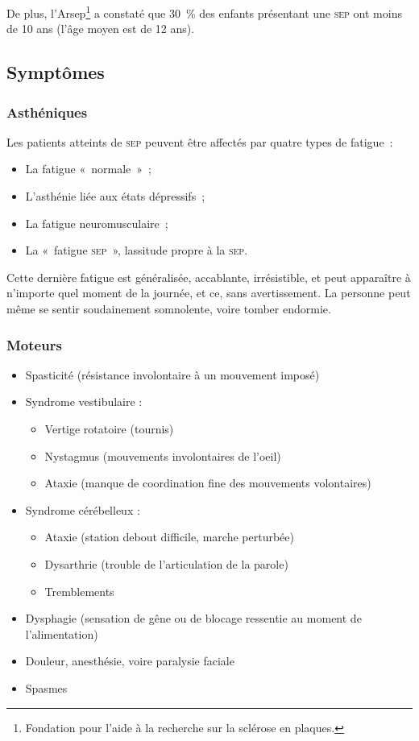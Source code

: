 \documentclass[a4paper,12pt,francais]{article}
\newcommand{\SEP}{\textsc{sep}\xspace}
\begin{document}
De plus, l’Arsep\footnote{Fondation pour l'aide à la recherche sur la sclérose en plaques.} a constaté que 30~\% des enfants présentant une \SEP{} ont moins de 10 ans (l’âge moyen est de 12 ans).

\subsection{Symptômes}

\subsubsection{Asthéniques}
Les patients atteints de \SEP{} peuvent être affectés par quatre types de fatigue~:
\begin{itemize}
    \item La fatigue «~normale~»~;
    \item L’asthénie liée aux états dépressifs~;
    \item La fatigue neuromusculaire~;
    \item La «~fatigue \SEP{}~», lassitude propre à la \SEP{}.
\end{itemize}

Cette dernière fatigue est généralisée, accablante, irrésistible, et peut apparaître à n’importe quel moment de la journée, et ce, sans avertissement. La personne peut même se sentir soudainement somnolente, voire tomber endormie.

\subsubsection{Moteurs}
\begin{itemize}
    \item Spasticité (résistance involontaire à un mouvement imposé)
	\item Syndrome vestibulaire :
			\begin{itemize}
				\item Vertige rotatoire (tournis)
				\item Nystagmus (mouvements involontaires de l'oeil)
				\item Ataxie (manque de coordination fine des mouvements volontaires)
			\end{itemize}
	\item Syndrome cérébelleux :
			\begin{itemize}
				\item Ataxie (station debout difficile, marche perturbée)
				\item Dysarthrie (trouble de l'articulation de la parole)
				\item Tremblements
			\end{itemize}
	\item Dysphagie (sensation de gêne ou de blocage ressentie au moment de l'alimentation)
	\item Douleur, anesthésie, voire paralysie faciale
	\item Spasmes
\end{itemize}
\end{document}

